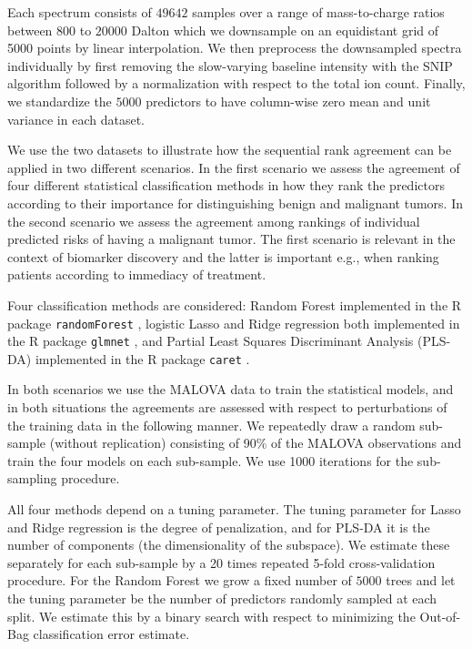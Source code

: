 \documentclass[12pt,a4paper]{article}
\theoremstyle{plain}
\begin{document}
Each spectrum consists of $49642$ samples over a range of mass-to-charge ratios
between $800$ to $20000$ Dalton which we downsample on an equidistant grid of
5000 points by linear interpolation. We then preprocess the downsampled
spectra individually by first removing the slow-varying baseline intensity
with the SNIP algorithm \citep{ryan1988snip} followed by a
normalization with respect to the total ion count. Finally, we standardize
the $5000$ predictors to have column-wise zero mean and unit variance in
each dataset.

We use the two datasets to illustrate how the sequential rank
agreement can be applied in two different scenarios. In the first
scenario we assess the agreement of four different statistical
classification methods in how they rank the predictors according to
their importance for distinguishing benign and malignant tumors. In
the second scenario we assess the agreement among rankings of
individual predicted risks of having a malignant tumor. The first
scenario is relevant in the context of biomarker discovery and the
latter is important e.g., when ranking patients according to immediacy of
treatment.

Four classification methods are considered: Random Forest
\citep{breiman2001random} implemented in the R package
\texttt{randomForest} \citep{liaw2002classification}, logistic Lasso
\citep{tibshirani1996regression} and Ridge regression
\citep{segerstedt1992ordinary} both implemented in the R package
\texttt{glmnet} \citep{friedman2010regularization}, and Partial Least
Squares Discriminant Analysis (PLS-DA) \citep{boulesteix2004pls}
implemented in the R package \texttt{caret} \citep{Jed-Wing:2014aa}.

In both scenarios we use the MALOVA data to train the statistical
models, and in both situations the agreements are assessed with
respect to perturbations of the training data in the following
manner. We repeatedly draw a random sub-sample (without replication)
consisting of 90\% of the MALOVA observations and train the four
models on each sub-sample. We use 1000 iterations for the sub-sampling
procedure.

All four methods depend on a tuning parameter. The tuning parameter for
Lasso and Ridge regression is the degree of penalization, and for PLS-DA
it is the number of components (the dimensionality of the subspace).
We estimate these separately for each sub-sample by a 20 times repeated
5-fold cross-validation procedure. For the Random Forest we grow a fixed
number of $5000$ trees and let the tuning parameter be the number of
predictors randomly sampled at each split. We estimate this by a binary
search with respect to minimizing the Out-of-Bag classification error estimate.
\end{document}
